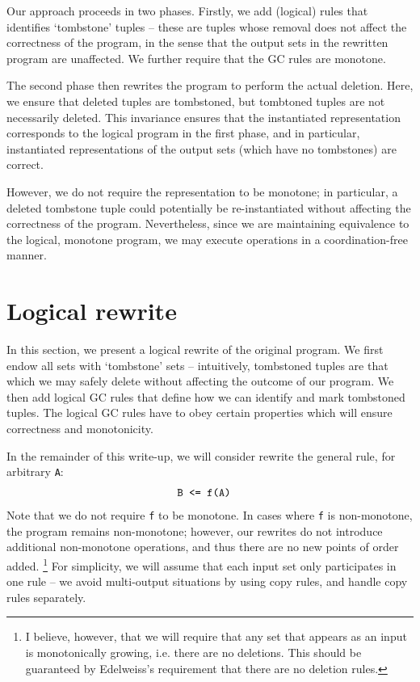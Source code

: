 \documentclass[10pt]{proc}
\numberwithin{equation}{section}
\renewcommand{\tt}[1]{\ifmmode\text{\texttt{#1}}\else\texttt{#1}\fi}
\begin{document}
Our approach proceeds in two phases.
Firstly, we add (logical) rules that identifies `tombstone' tuples -- these are tuples whose removal does not affect the correctness of the program, in the sense that the output sets in the rewritten program are unaffected.
We further require that the GC rules are monotone.

The second phase then rewrites the program to perform the actual deletion.
Here, we ensure that deleted tuples are tombstoned, but tombtoned tuples are not necessarily deleted.
This invariance ensures that the instantiated representation corresponds to the logical program in the first phase, and in particular, instantiated representations of the output sets (which have no tombstones) are correct.

However, we do not require the representation to be monotone; in particular, a deleted tombstone tuple could potentially be re-instantiated without affecting the correctness of the program.
Nevertheless, since we are maintaining equivalence to the logical, monotone program, we may execute operations in a coordination-free manner.

\section{Logical rewrite}
In this section, we present a logical rewrite of the original program.
We first endow all sets with `tombstone' sets -- intuitively, tombstoned tuples are that which we may safely delete without affecting the outcome of our program.
We then add logical GC rules that define how we can identify and mark tombstoned tuples.
The logical GC rules have to obey certain properties which will ensure correctness and monotonicity.

In the remainder of this write-up, we will consider rewrite the general rule, for arbitrary \tt{A}:
\begin{align}
\tt{B} &\tt{ <= f(A)}
\end{align}
Note that we do not require \tt{f} to be monotone.
In cases where \tt{f} is non-monotone, the program remains non-monotone; however, our rewrites do not introduce additional non-monotone operations, and thus there are no new points of order added.
\footnote{I believe, however, that we will require that any set that appears as an input is monotonically growing, i.e. there are no deletions. This should be guaranteed by Edelweiss's requirement that there are no deletion rules.}
For simplicity, we will assume that each input set only participates in one rule -- we avoid multi-output situations by using copy rules, and handle copy rules separately.
\end{document}
